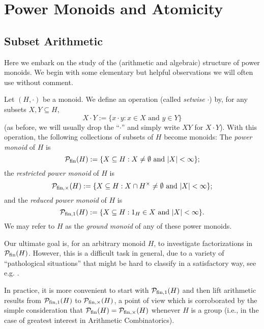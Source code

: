 \chapter{Power Monoids and Atomicity} \label{ch:power monoids}

\section{Subset Arithmetic} \label{sec:pm basics}
Here we embark on the study of the (arithmetic and algebraic) structure of power monoids.
We begin with some elementary but helpful observations we will often use without comment.
\begin{defn} \label{def:power monoid}
	Let $(H,\cdot)$ be a monoid.
	We define an operation (called \textit{setwise} $\cdot$) by, for any subsets $X,Y\subseteq H$,
	\[X\cdot Y := \{x\cdot y: x\in X \textrm{ and } y\in Y\} \]
	(as before, we will usually drop the ``$\cdot$'' and simply write $XY$ for $X\cdot Y$).
	With this operation, the following collections of subsets of $H$ become monoids:
	The \textit{power monoid} of $H$ is
	\[\mathcal{P}_{\textrm{fin}}(H) := \{X\subseteq H: X\neq\emptyset \textrm{ and } |X|<\infty \}; \]
	the \textit{restricted power monoid} of $H$ is
	\[\mathcal{P}_{\textrm{fin}, \times}(H) := \{X\subseteq H: X\cap H^\times \neq \emptyset \textrm{ and } |X|<\infty\}; \]
	and the \textit{reduced power monoid} of $H$ is
	\[\mathcal{P}_{\textrm{fin}, 1}(H) := \{X\subseteq H: 1_H\in X \textrm{ and } |X|<\infty\}. \]
	We may refer to $H$ as the \textit{ground monoid} of any of these power monoids.
\end{defn}
Our ultimate goal is, for an arbitrary monoid $H$, to investigate factorizations in $\mathcal{P}_{\textrm{fin}}(H)$. However, this is a difficult task in general, due to a variety of ``pathological situations'' that might be hard to classify in a satisfactory way, see e.g. \cite[Remark 3.3(ii)]{fan-tringali18}.

In practice, it is more convenient to start with $\mathcal{P}_{\textrm{fin}, 1}(H)$ and then lift arithmetic results from $\mathcal{P}_{\textrm{fin}, 1}(H)$ to $\mathcal{P}_{\textrm{fin}, \times}(H)$, a point of view which is corroborated by the simple consideration that $\mathcal{P}_{\textrm{fin}}(H) = \mathcal{P}_{\textrm{fin}, \times}(H)$ whenever $H$ is a group (i.e., in the case of greatest interest in Arithmetic Combinatorics).

